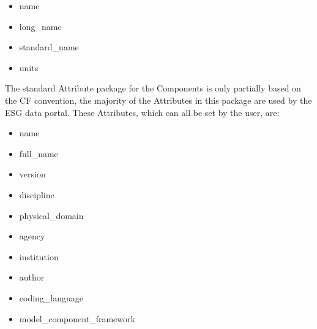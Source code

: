 \begin{itemize}
\item name
\item long\_name
\item standard\_name
\item units
\end{itemize}

The standard Attribute package for the Components is only partially based on the CF convention, the majority of the Attributes in this package are used by the ESG data portal.  These Attributes, which can all be set by the user, are:

\begin{itemize}
\item name
\item full\_name
\item version
\item discipline
\item physical\_domain
\item agency
\item institution
\item author
\item coding\_language
\item model\_component\_framework
\end{itemize}









